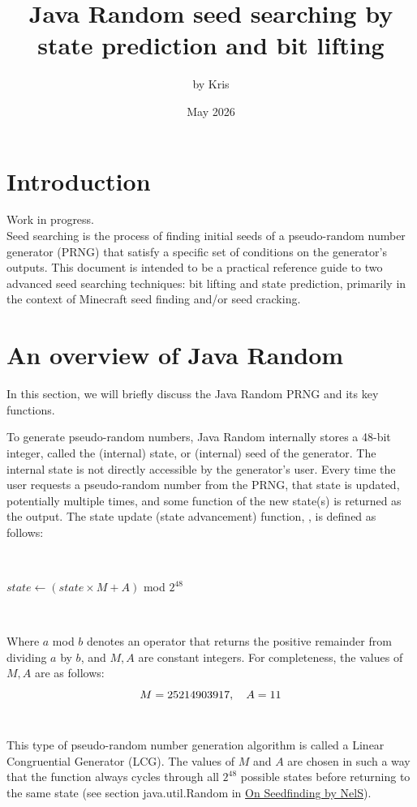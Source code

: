 \documentclass{article}
\title{Java Random seed searching by state prediction and bit lifting}
\author{by Kris}
\date{May 2026}
\begin{document}
\maketitle

\section{Introduction}
Work in progress.\\
Seed searching is the process of finding initial seeds of a pseudo-random number generator (PRNG) that satisfy a specific set of conditions on the generator's outputs. %
This document is intended to be a practical reference guide to two advanced seed searching techniques: bit lifting and state prediction, primarily in the context of Minecraft seed finding and/or seed cracking.

\section{An overview of Java Random}
In this section, we will briefly discuss the Java Random PRNG and its key functions.

To generate pseudo-random numbers, Java Random internally stores a 48-bit integer, called the (internal) state, or (internal) seed of the generator. The internal state is not directly accessible by the generator’s user. Every time the user requests a pseudo-random number from the PRNG, that state is updated, potentially multiple times, and some function of the new state(s) is returned as the output. The state update (state advancement) function, , is defined as follows:

\
\begin{algorithmic}
    \State $state \gets (state \times M + A)$ mod $2^{48}$
\EndFunction
\end{algorithmic}
\ \

\noindent Where $a$ mod $b$ denotes an operator that returns the positive remainder from dividing $a$ by $b$, and $M, A$ are constant integers. For completeness, the values of $M, A$ are as follows:
\begin{equation}\notag
    M = 25214903917, \quad A = 11
\end{equation}
\ \

This type of pseudo-random number generation algorithm is called a Linear Congruential Generator (LCG). The values of $M$ and $A$ are chosen in such a way that the  function always cycles through all $2^{48}$ possible states before returning to the same state (see section java.util.Random in \href{https://docs.google.com/document/d/1V1wpuHcewQM3loxzVW0LQqASc17LkxeN6qugebkHkJ8}{On Seedfinding by NelS}).
\end{document}
